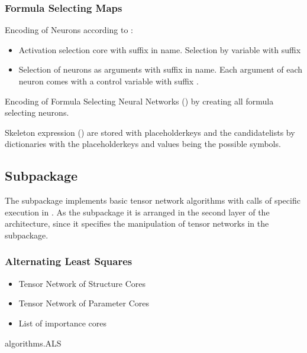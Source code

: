 \subsubsection{Formula Selecting Maps}

Encoding of Neurons according to :
\begin{itemize}
	\item Activation selection core with suffix  in name.
		 Selection by variable with suffix 
	\item Selection of neurons as arguments with suffix  in name.
		Each argument of each neuron comes with a control variable with suffix .
\end{itemize}

Encoding of Formula Selecting Neural Networks () by creating all formula selecting neurons.

Skeleton expression () are stored with placeholderkeys and the candidatelists by dictionaries with the placeholderkeys and values being the possible symbols.



\subsection{Subpackage \spalgorithms}

The \spalgorithms subpackage implements basic tensor network algorithms with calls of specific execution in \spengine.
As the \spencoding subpackage it is arranged in the second layer of the \tnreason architecture, since it specifies the manipulation of tensor networks in the \spengine subpackage.


\subsubsection{Alternating Least Squares}

\begin{itemize}
	\item Tensor Network of Structure Cores
	\item Tensor Network of Parameter Cores
	\item List of importance cores
\end{itemize}

\begin{centeredcode}
	algorithms.ALS
\end{centeredcode}

